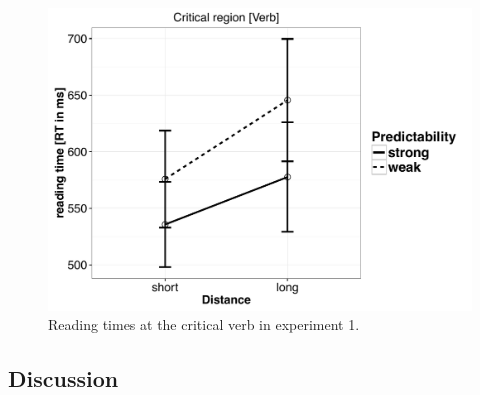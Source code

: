 \documentclass{frontiersSCNS}\usepackage{knitr} %
\begin{document}
\begin{figure}[!htbp]
\begin{knitrout}
\color{fgcolor}

{\centering \includegraphics[width=\maxwidth]{Figures/SafaviEtAlfigureplotexpt1-1} 

}



\end{knitrout}
\caption{Reading times at the critical verb in experiment 1.}\label{fig:SPR1-interaction}
\end{figure}


\subsection{Discussion}
\end{document}
